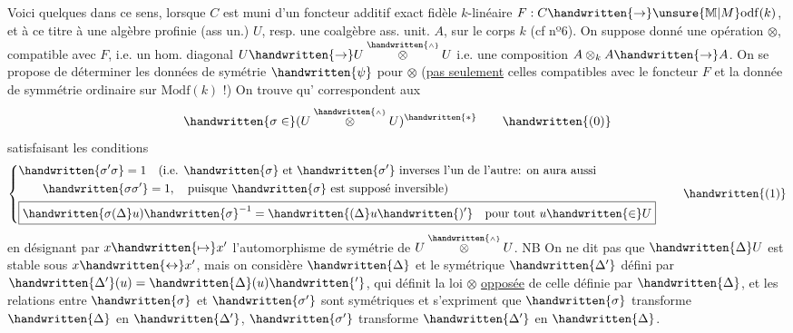 Voici quelques  dans ce sens, lorsque $C$ est muni d'un foncteur additif exact fidèle $k$-linéaire $F:C\handwritten{\to}\unsure{\mathbb{M}|M}\mathrm{odf}(k)$, et  à ce titre à une algèbre profinie (ass un.) $U$, resp. une coalgèbre ass. unit. $A$, sur le corps $k$ (cf nº6). On  suppose donné une opération $\otimes$, compatible avec $F$, i.e. un hom. diagonal $U\handwritten{\to}U\overset{\handwritten{\scriptscriptstyle\wedge}}{\otimes}U$ i.e. une composition $A\otimes_kA\handwritten{\to}A$. On se propose de déterminer les données de symétrie $\handwritten{\psi}$ pour $\otimes$ (\uline{pas seulement} celles compatibles avec le foncteur $F$ et la donnée de symmétrie ordinaire sur $\mathrm{Modf}(k)$ !) On trouve qu' correspondent aux
\margin{\handwritten{[Dans le cas du nº 6, \uline{\unsure{gr. deux|gr. deu.}}, on aura $\sigma=\pi^+\otimes\pi^++\pi^+\otimes\pi^-+\pi^-\otimes\pi^+-\pi^-\otimes\pi^-$]}}
\[
\handwritten{\sigma\in}(U\overset{\handwritten{\scriptscriptstyle\wedge}}{\otimes}U)^{\handwritten{*}}
\tag*{\handwritten{(0)}}
\]
satisfaisant les conditions
\[
\left\{\begin{aligned}
&\handwritten{\sigma'\sigma}=1\quad\text{(i.e. }\handwritten{\sigma}\text{ et }\handwritten{\sigma'}\text{ inverses l'un de l'autre: on aura aussi}\\
&\qquad\handwritten{\sigma\sigma'}=1,\quad\text{puisque }\handwritten{\sigma}\text{ est supposé inversible)}\\
&\boxed{\handwritten{\sigma(\Delta}u)\handwritten{\sigma}^{-1}=\handwritten{(\Delta}u\handwritten{)'}\quad\text{pour tout }u\handwritten{\in}U}
\end{aligned}\right.
\tag*{\handwritten{(1)}}
\]
en désignant par $x\handwritten{\mapsto}x'$ l'automorphisme de symétrie de $U\overset{\handwritten{\scriptscriptstyle\wedge}}{\otimes}U$. NB On ne dit pas que $\handwritten{\Delta}U$ est stable sous $x\handwritten{\leftrightarrow}x'$, mais on considère $\handwritten{\Delta}$ et le symétrique $\handwritten{\Delta'}$ défini par $\handwritten{\Delta'}(u)=\handwritten{\Delta}(u)\handwritten{'}$, qui définit la loi $\otimes$ \uline{opposée} de celle définie par $\handwritten{\Delta}$, et les relations entre $\handwritten{\sigma}$ et $\handwritten{\sigma'}$ sont symétriques et s'expriment que $\handwritten{\sigma}$ transforme $\handwritten{\Delta}$ en $\handwritten{\Delta'}$, $\handwritten{\sigma'}$ transforme $\handwritten{\Delta'}$ en $\handwritten{\Delta}$.

